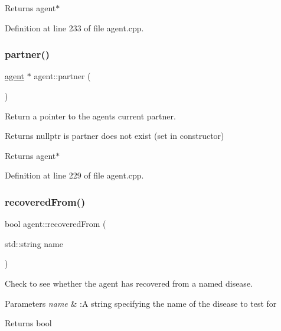 \begin{DoxyReturn}{Returns}
agent$\ast$ 
\end{DoxyReturn}


Definition at line 233 of file agent.\+cpp.

\mbox{\label{classagent_a1e9532f2be4b2b08ee7cdd2a7761237b}} 
\subsubsection{\texorpdfstring{partner()}{partner()}}
{\footnotesize\ttfamily \mbox{\hyperlink{classagent}{agent}} $\ast$ agent\+::partner (\begin{DoxyParamCaption}{ }\end{DoxyParamCaption})}



Return a pointer to the agent\textquotesingle{}s current partner. 

Returns nullptr is partner does not exist (set in constructor)

\begin{DoxyReturn}{Returns}
agent$\ast$ 
\end{DoxyReturn}


Definition at line 229 of file agent.\+cpp.

\mbox{\label{classagent_a0eee49d52e6c47d7b425bc72cf5caf67}} 
\subsubsection{\texorpdfstring{recovered\+From()}{recoveredFrom()}}
{\footnotesize\ttfamily bool agent\+::recovered\+From (\begin{DoxyParamCaption}\item[{std\+::string}]{name }\end{DoxyParamCaption})}



Check to see whether the agent has recovered from a named disease. 


\begin{DoxyParams}{Parameters}
{\em name} & \+:A string specifying the name of the disease to test for\\
\hline
\end{DoxyParams}
\begin{DoxyReturn}{Returns}
bool 
\end{DoxyReturn}


